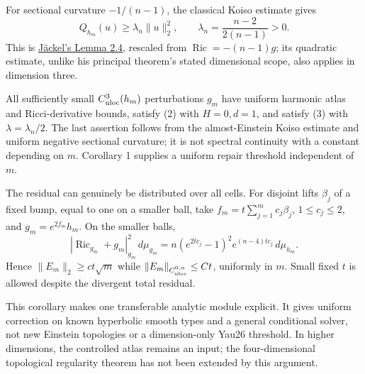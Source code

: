 \documentclass[
  11pt,
]{article}
\begin{document}
For sectional curvature \(-1/(n-1)\), the classical Koiso estimate gives
\[
 Q_{h_m}(u)\ge\lambda_n\|u\|_2^2,
 \qquad \lambda_n=\frac{n-2}{2(n-1)}>0.                     \tag{6}
\] This is \href{https://arxiv.org/html/2502.16692v2}{Jäckel's Lemma
2.4}, rescaled from \(\operatorname{Ric}=-(n-1)g\); its quadratic
estimate, unlike his principal theorem's stated dimensional scope, also
applies in dimension three.

All sufficiently small \(C^3_{\rm uloc}(h_m)\) perturbations \(g_m\)
have uniform harmonic atlas and Ricci-derivative bounds, satisfy (2)
with \(H=0,d=1\), and satisfy (3) with \(\lambda=\lambda_n/2\). The last
assertion follows from the almost-Einstein Koiso estimate and uniform
negative sectional curvature; it is not spectral continuity with a
constant depending on \(m\). Corollary 1 supplies a uniform repair
threshold independent of \(m\).

The residual can genuinely be distributed over all cells. For disjoint
lifts \(\beta_j\) of a fixed bump, equal to one on a smaller ball, take
\(f_m=t\sum_{j=1}^m c_j\beta_j\), \(1\le c_j\le2\), and
\(g_m=e^{2f_m}h_m\). On the smaller balls, \[
 |\operatorname{Ric}_{g_m}+g_m|_{g_m}^2\,d\mu_{g_m}
 =n(e^{2tc_j}-1)^2e^{(n-4)tc_j}\,d\mu_{h_m}.
\] Hence \(\|E_m\|_2\ge c t\sqrt m\) while
\(\|E_m\|_{C^{0,\alpha}_{\rm uloc}}\le Ct\), uniformly in \(m\). Small
fixed \(t\) is allowed despite the divergent total residual.

This corollary makes one transferable analytic module explicit. It gives
uniform correction on known hyperbolic smooth types and a general
conditional solver, not new Einstein topologies or a dimension-only
Yau26 threshold. In higher dimensions, the controlled atlas remains an
input; the four-dimensional topological regularity theorem has not been
extended by this argument.
\end{document}
